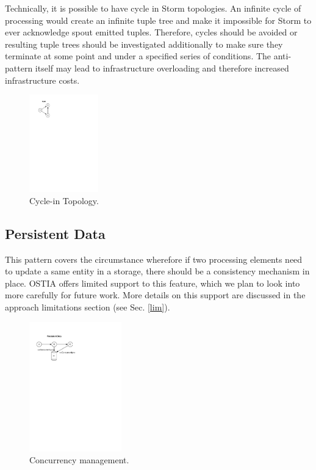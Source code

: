 Technically, it is possible to have cycle in Storm topologies. An infinite cycle of processing would create an infinite tuple tree and make it impossible for Storm to ever acknowledge spout emitted tuples. Therefore, cycles should be avoided or resulting tuple trees should be investigated additionally to make sure they terminate at some point and under a specified series of conditions. The anti-pattern itself may lead to infrastructure overloading and therefore increased infrastructure costs.

\begin{figure}[H]
	\begin{center}
		\includegraphics[width=3cm]{images/cycle}
		\caption{Cycle-in Topology.}
		\label{fig:cycle}
	\end{center}
\end{figure}

\subsection{Persistent Data}

This pattern covers the circumstance wherefore if two processing elements need to update a same entity in a storage, there should be a consistency mechanism in place. OSTIA offers limited support to this feature, which we plan to look into more carefully for future work. More details on this support are discussed in the approach limitations section (see Sec. \ref{lim}).

\begin{figure}[H]
	\begin{center}
		\includegraphics[width=4cm]{images/persistence}
		\caption{Concurrency management.}
		\label{fig:persistence}
	\end{center}
\end{figure}

